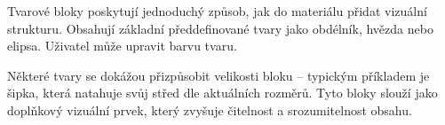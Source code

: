 Tvarové bloky poskytují jednoduchý způsob, jak do materiálu přidat vizuální strukturu. 
Obsahují základní předdefinované tvary jako obdélník, hvězda nebo elipsa. Uživatel může upravit barvu tvaru.

Některé tvary se dokážou přizpůsobit velikosti bloku -- typickým příkladem je šipka, která natahuje svůj střed dle aktuálních rozměrů.
Tyto bloky slouží jako doplňkový vizuální prvek, který zvyšuje čitelnost a srozumitelnost obsahu.









